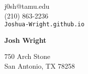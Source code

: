 \documentclass[12pt]{article}
\begin{document}
\noindent

\begin{minipage}{0.3\linewidth}
\begin{flushleft}
j0sh@tamu.edu\\
(210) 863-2236\\
\verb|Joshua-Wright.github.io|
\end{flushleft}
\end{minipage}
\hfill
\begin{minipage}{0.3\linewidth}
\begin{center}
{\Huge\textbf{Josh Wright}}
\end{center}
\end{minipage}
\hfill
\begin{minipage}{0.3\linewidth}
\begin{flushright}
750 Arch Stone\\
San Antonio, TX 78258
\end{flushright}
\end{minipage}
\end{document}
